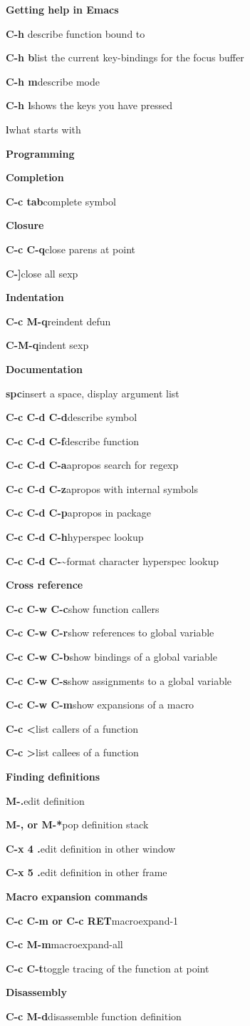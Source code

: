 \documentclass[a4paper,10pt]{article}
\newcommand{\group}[1]{\bigskip\par\noindent\textbf{\large#1}\medskip}
\newcommand{\subgroup}[1]{\medskip\par\noindent\textbf{#1}\smallskip}
\newcommand{\key}[2]{\par\noindent\textbf{#1}\hfill{#2}}
\newcommand{\meta}[1]{\textlangle{#1}\textrangle}
\begin{document}

\group{Getting help in Emacs}

\key{C-h \meta{key}}{describe function bound to \meta{key}}
\key{C-h b}{list the current key-bindings for the focus buffer}
\key{C-h m}{describe mode}
\key{C-h l}{shows the keys you have pressed}
\key{\meta{key} l}{what starts with \meta{key}}

\group{Programming}

\subgroup{Completion}

\key{C-c tab}{complete symbol}

\subgroup{Closure}

\key{C-c C-q}{close parens at point}
\key{C-]}{close all sexp}

\subgroup{Indentation}

\key{C-c M-q}{reindent defun}
\key{C-M-q}{indent sexp}

\subgroup{Documentation}

\key{spc}{insert a space, display argument list}
\key{C-c C-d C-d}{describe symbol}
\key{C-c C-d C-f}{describe function}
\key{C-c C-d C-a}{apropos search for regexp}
\key{C-c C-d C-z}{apropos with internal symbols}
\key{C-c C-d C-p}{apropos in package}
\key{C-c C-d C-h}{hyperspec lookup}
\key{C-c C-d C-\~}{format character hyperspec lookup}


\subgroup{Cross reference}

\key{C-c C-w C-c}{show function callers}
\key{C-c C-w C-r}{show references to global variable}
\key{C-c C-w C-b}{show bindings of a global variable}
\key{C-c C-w C-s}{show assignments to a global variable}
\key{C-c C-w C-m}{show expansions of a macro}
\key{C-c \textless}{list callers of a function}
\key{C-c \textgreater}{list callees of a function}

\subgroup{Finding definitions}

\key{M-.}{edit definition}
\key{M-, or M-*}{pop definition stack}
\key{C-x 4 .}{edit definition in other window}
\key{C-x 5 .}{edit definition in other frame}

\newpage

\subgroup{Macro expansion commands}

\key{C-c C-m or C-c RET}{macroexpand-1}
\key{C-c M-m}{macroexpand-all}
\key{C-c C-t}{toggle tracing of the function at point}

\subgroup{Disassembly}

\key{C-c M-d}{disassemble function definition}
\end{document}
